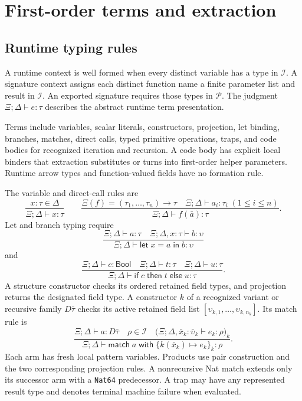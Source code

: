 \documentclass[11pt]{article}
\newcommand{\code}[1]{\texttt{#1}}
\newcommand{\ty}[1]{\mathsf{#1}}
\newcommand{\I}{\mathcal{I}}
\newcommand{\Pp}{\mathcal{P}}
\begin{document}
\section{First-order terms and extraction}

\subsection{Runtime typing rules}

A runtime context is well formed when every distinct variable has a type in $\I$.  A signature context assigns each distinct function name a finite parameter list and result in $\I$.  An exported signature requires those types in $\Pp$.  The judgment $\Xi;\Delta\vdash e:\tau$ describes the abstract runtime term presentation.

Terms include variables, scalar literals, constructors, projection, let binding, branches, matches, direct calls, typed primitive operations, traps, and code bodies for recognized iteration and recursion.  A code body has explicit local binders that extraction substitutes or turns into first-order helper parameters.  Runtime arrow types and function-valued fields have no formation rule.

The variable and direct-call rules are
\[
\frac{x:\tau\in\Delta}{\Xi;\Delta\vdash x:\tau}
\qquad
\frac{\Xi(f)=(\tau_1,\ldots,\tau_n)\to\tau\quad
      \Xi;\Delta\vdash a_i:\tau_i\;(1\le i\le n)}
     {\Xi;\Delta\vdash f(\bar a):\tau}.
\]
Let and branch typing require
\[
\frac{\Xi;\Delta\vdash a:\tau\quad\Xi;\Delta,x:\tau\vdash b:\upsilon}
     {\Xi;\Delta\vdash\ty{let}\;x=a\;\ty{in}\;b:\upsilon}
\]
and
\[
\frac{\Xi;\Delta\vdash c:\ty{Bool}\quad
      \Xi;\Delta\vdash t:\tau\quad\Xi;\Delta\vdash u:\tau}
     {\Xi;\Delta\vdash\ty{if}\;c\;\ty{then}\;t\;\ty{else}\;u:\tau}.
\]
A structure constructor checks its ordered retained field types, and projection returns the designated field type.  A constructor $k$ of a recognized variant or recursive family $D\bar\tau$ checks its active retained field list $[\upsilon_{k,1},\ldots,\upsilon_{k,n_k}]$.  Its match rule is
\[
\frac{\Xi;\Delta\vdash a:D\bar\tau\quad\rho\in\I\quad
 \bigl(\Xi;\Delta,\bar x_k:\bar\upsilon_k\vdash e_k:\rho\bigr)_{k}}
 {\Xi;\Delta\vdash\ty{match}\;a\;\ty{with}\;\{k(\bar x_k)\mapsto e_k\}_k:\rho}.
\]
Each arm has fresh local pattern variables.  Products use pair construction and the two corresponding projection rules.  A nonrecursive Nat match extends only its successor arm with a \code{Nat64} predecessor.  A trap may have any represented result type and denotes terminal machine failure when evaluated.
\end{document}
